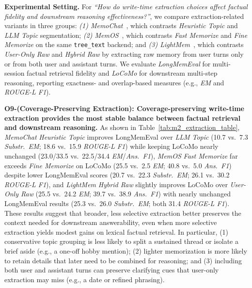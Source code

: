 \noindent \textbf{Experimental Setting.}
For \textit{``How do write-time extraction choices affect factual fidelity and downstream reasoning effectiveness?''}, we compare extraction-related variants in three groups:
\textit{(1) MemoChat}~\cite{Memochat}, which contrasts \textit{Heuristic Topic} and \textit{LLM Topic} segmentation;
\textit{(2) MemOS}~\cite{MemOS}, which contrasts \textit{Fast Memorize} and \textit{Fine Memorize} on the same \texttt{tree\_text} backend;
and \textit{(3) LightMem}~\cite{LightMem}, which contrasts \textit{User-Only Raw} and \textit{Hybrid Raw} by extracting raw memory from user turns only or from both user and assistant turns.
We evaluate \textit{LongMemEval} for multi-session factual retrieval fidelity and \textit{LoCoMo} for downstream multi-step reasoning, reporting exactness- and overlap-based measures (e.g., \textit{EM} and \textit{ROUGE-L F1}).

\noindent \textbf{O9-(Coverage-Preserving Extraction): Coverage-preserving write-time extraction provides the most stable balance between factual retrieval and downstream reasoning.}
As shown in Table~\ref{tab:m2_extraction_table}, \textit{MemoChat} \textit{Heuristic Topic} improves LongMemEval over \textit{LLM Topic} (10.7 vs.\ 7.3 \textit{Substr.\ EM}; 18.6 vs.\ 15.9 \textit{ROUGE-L F1}) while keeping LoCoMo nearly unchanged (23.0/33.5 vs.\ 22.5/34.4 \textit{EM}/\textit{Ans.\ F1}), \textit{MemOS} \textit{Fast Memorize} far exceeds \textit{Fine Memorize} on LoCoMo (25.5 vs.\ 2.5 \textit{EM}; 40.8 vs.\ 5.0 \textit{Ans.\ F1}) despite lower LongMemEval scores (20.7 vs.\ 22.3 \textit{Substr.\ EM}; 26.1 vs.\ 30.2 \textit{ROUGE-L F1}), and \textit{LightMem} \textit{Hybrid Raw} slightly improves LoCoMo over \textit{User-Only Raw} (25.5 vs.\ 24.2 \textit{EM}; 39.7 vs.\ 38.9 \textit{Ans.\ F1}) with nearly unchanged LongMemEval results (25.3 vs.\ 26.0 \textit{Substr.\ EM}; both 31.4 \textit{ROUGE-L F1}).
These results suggest that broader, less selective extraction better preserves the context needed for downstream answerability, even when more selective extraction yields modest gains on lexical factual retrieval.
In particular, (1) conservative topic grouping is less likely to split a sustained thread or isolate a brief aside (e.g., a one-off hobby mention); (2) lighter memorization is more likely to retain details that later need to be combined for reasoning; 
and (3) including both user and assistant turns can preserve clarifying cues that user-only extraction may miss (e.g., a date or refined phrasing).

